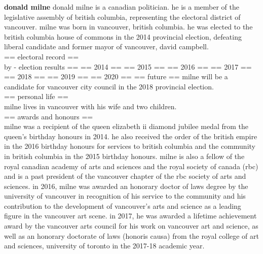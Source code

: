 \documentclass[11pt,a4paper]{article}
\begin{document}
\begin{figure*}[t]
    \noindent \textbf{donald milne} donald milne is a canadian politician. he is a member of the legislative assembly of british columbia, representing the electoral district of vancouver. milne was born in vancouver, british columbia. he was elected to the british columbia house of commons in the 2014 provincial election, defeating liberal candidate and former mayor of vancouver, david campbell. \\ 
    == electoral record == \\ by - election results == == 2014 == == 2015 == == 2016 == == 2017 == == 2018 == == 2019 == == 2020 == == future == milne will be a candidate for vancouver city council in the 2018 provincial election. \\
    == personal life == \\ milne lives in vancouver with his wife and two children. \\
    == awards and honours == \\ milne was a recipient of the queen elizabeth ii diamond jubilee medal from the queen's birthday honours in 2014. he also received the order of the british empire in the 2016 birthday honours for services to british columbia and the community in british columbia in the 2015 birthday honours. milne is also a fellow of the royal canadian academy of arts and sciences and the royal society of canada (rbc) and is a past president of the vancouver chapter of the rbc society of arts and sciences. in 2016, milne was awarded an honorary doctor of laws degree by the university of vancouver in recognition of his service to the community and his contribution to the development of vancouver's arts and science as a leading figure in the vancouver art scene. in 2017, he was awarded a lifetime achievement award by the vancouver arts council for his work on vancouver art and science, as well as an honorary doctorate of laws (honoris causa) from the royal college of art and sciences, university of toronto in the 2017-18 academic year. \\
    

\end{figure*}
\end{document}
